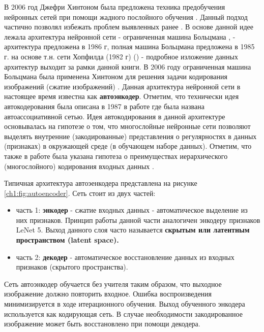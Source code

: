 \documentclass[12pt]{article}
\begin{document}
\begin{sloppypar}
В 2006 год Джефри Хинтоном была предложена техника предобучения нейронных сетей при помощи жадного послойного обучения \cite{hinton2006fast, hinton2007recognize}. Данный подход частично позволял избежать проблем выявленных ранее \cite{goodfellow2016deep}. 
В основе данной идее лежала архитектура нейронной сети - ограниченная машина Больцмана \cite{ackley1985learning, mcclelland1986parallel}, - архитектура предложена в 1986 г, полная машина Больцмана предложена в 1985 г. на основе т.н. сети Хопфилда (1982 г) (\cite{hopfield1982neural}) - подробное изложение данных архитектур выходит за рамки данной книги. 
В 2006 году ограниченная машина Больцмана была применена Хинтоном для решения задачи кодирования изображений (сжатие изображений) \cite{hinton2006reducing}. Данная архитектура нейронной сети в настоящее время известна как \textbf{автоэнкодер}. Отметим, что технически идея автокодерования была описана в 1987 в работе \cite{ballard1987modular} где была названа автоассоциативной сетью. Идея автокодирования в данной архитектуре основывалась на гипотезе о том, что многослойные нейронные сети позволяют выделять внутренние (закодированные) представления о регулярностях в данных (признаках) в окружающей среде (в обучающем наборе данных). Отметим, что также в работе \cite{ballard1987modular} была указана гипотеза о преимуществах иерархического (многослойного) кодирования входных данных  \cite{ballard1987modular}.

Типичная архитектура автоэенкодера представлена на рисунке \ref{ch1:fig:autoencoder}. Сеть стоит из двух частей:
\begin{itemize}
    \item часть 1: \textbf{энкодер} - сжатие входных данных - автоматическое выделение из них признаков. Принцип работы данной части аналогичен энкодеру признаков LeNet 5. Выход данного слоя часто называется \textbf{скрытым или латентным пространством (latent space).}
    \item часть 2: \textbf{декодер} - автоматическое восстановление данных из входных признаков (скрытого пространства).  
\end{itemize}
Сеть автоэнкодер обучается без учителя таким образом, что выходное изображение должно повторить входное. Ошибка воспроизведения минимизируется в ходе итерационного обучения. Выход обученного энкодера используется как кодирующая сеть. В случае необходимости закодированное изображение может быть восстановлено при помощи декодера.


\end{sloppypar}
\end{document}
